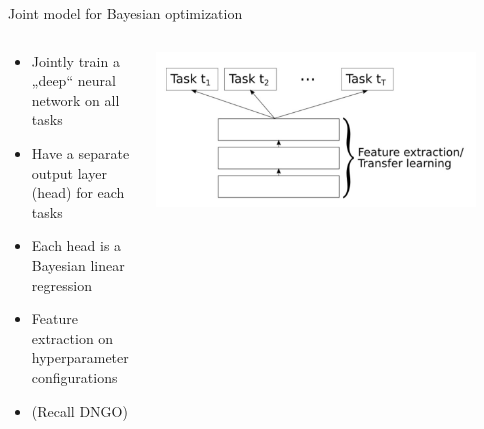 \begin{frame}[c]{Joint model for Bayesian optimization}

\begin{columns}[T] %
\begin{column}{.38\textwidth}

\begin{itemize}
    \item<1-> Jointly train a „deep“ neural network on all tasks 
    \item<2-> Have a separate output layer (head) for each tasks 
    \item<3-> Each head is a Bayesian linear regression 
    \item<4-> Feature extraction on hyperparameter configurations 
    \item<5-> (Recall DNGO)
\end{itemize}
\end{column}%

\hfill%

\begin{column}{.58\textwidth}
\includegraphics[width=0.9\textwidth]{../w07_hpo_speedup/images/meta_learning/perrone_int.jpg}
\end{column}%
\end{columns}

\hspace{12cm}

\end{frame}
%
%

